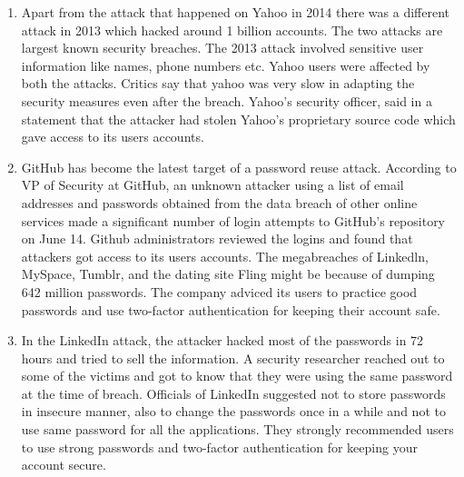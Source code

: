 \documentclass[12pt]{article}
\begin{document}
\begin{enumerate}
	\item Apart from the attack that happened on Yahoo in 2014 there was a different attack in 2013 which hacked around 1 billion accounts. The two attacks are largest known security breaches. The 2013 attack involved sensitive user information like names, phone numbers etc. Yahoo users were affected by both the attacks. Critics say that yahoo was very slow in adapting the security measures even after the breach. Yahoo’s security officer, said in a statement that the attacker had stolen Yahoo’s proprietary source code which gave access to its users accounts. \cite{yahoo}
	\item GitHub has become the latest target of a password reuse attack. According to  VP of Security at GitHub, an unknown attacker using a list of email addresses and passwords obtained from the data breach of other online services made a significant number of login attempts to GitHub's repository on June 14. Github administrators reviewed the logins and found that attackers got access to its users accounts. The megabreaches of Linkedln, MySpace, Tumblr, and the dating site Fling might be because of dumping 642 million passwords. The company adviced its users to practice good passwords and use two-factor authentication for keeping their account safe.  \cite{github}
	\item In the LinkedIn attack, the attacker hacked most of the passwords in 72 hours and tried to sell the information. A security researcher reached out to some of the victims and got to know that they were using the same password at the time of breach. Officials of LinkedIn suggested not to store passwords in insecure manner, also to change the passwords once in a while and not to use same password for all the applications. They strongly recommended users to use strong passwords and two-factor authentication for keeping your account secure\cite{linkedin}.
	
\end{enumerate}





\pagebreak
\end{document}
